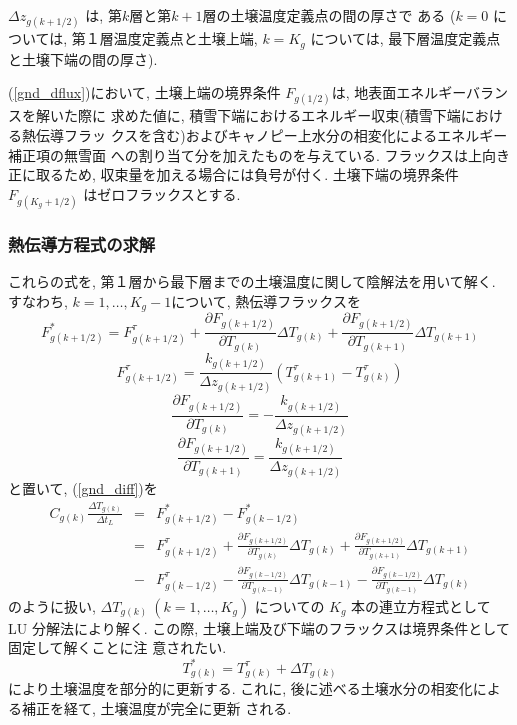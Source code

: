 $\Delta z_{g(k+1/2)}$ は, 第$k$層と第$k+1$層の土壌温度定義点の間の厚さで
ある ($k=0$ については, 第１層温度定義点と土壌上端, $k=K_g$ については,
最下層温度定義点と土壌下端の間の厚さ).

(\ref{gnd_dflux})において,
土壌上端の境界条件 $F_{g(1/2)}$は, 地表面エネルギーバランスを解いた際に
求めた値に, 積雪下端におけるエネルギー収束(積雪下端における熱伝導フラッ
クスを含む)およびキャノピー上水分の相変化によるエネルギー補正項の無雪面
への割り当て分を加えたものを与えている. フラックスは上向き正に取るため,
収束量を加える場合には負号が付く.
土壌下端の境界条件 $F_{g(K_g+1/2)}$ はゼロフラックスとする.

\subsubsection{熱伝導方程式の求解}

これらの式を, 第１層から最下層までの土壌温度に関して陰解法を用いて解く.
すなわち, $k=1,\ldots,K_g-1$について, 熱伝導フラックスを
\begin{equation}
  F_{g(k+1/2)}^{*} = F_{g(k+1/2)}^{\tau}
+\frac{\partial {F}_{g(k+1/2)}}{\partial T_{g(k)}}
 \Delta T_{g(k)}
+\frac{\partial {F}_{g(k+1/2)}}{\partial T_{g(k+1)}}
 \Delta T_{g(k+1)}
\end{equation}
\begin{equation}
  F_{g(k+1/2)}^{\tau} =
\frac{k_{g(k+1/2)}}{\Delta z_{g(k+1/2)}}(T_{g(k+1)}^{\tau} - T_{g(k)}^{\tau})
\end{equation}
\begin{equation}
 \frac{\partial {F}_{g(k+1/2)}}{\partial T_{g(k)}} =
- \frac{k_{g(k+1/2)}}{\Delta z_{g(k+1/2)}}
\end{equation}
\begin{equation}
 \frac{\partial {F}_{g(k+1/2)}}{\partial T_{g(k+1)}} =
\frac{k_{g(k+1/2)}}{\Delta z_{g(k+1/2)}}
\end{equation}
と置いて, (\ref{gnd_diff})を
\begin{eqnarray}
C_{g(k)} \frac{\Delta T_{g(k)}}{\Delta t_L}
&=& F_{g(k+1/2)}^* - {F}_{g(k-1/2)}^* \nonumber \\
&=& {F}_{g(k+1/2)}^{\tau}
+\frac{\partial F_{g(k+1/2)}}{\partial T_{g(k)}}
 \Delta T_{g(k)}
+\frac{\partial F_{g(k+1/2)}}{\partial T_{g(k+1)}}
 \Delta T_{g(k+1)} \nonumber \\
&-& F_{g(k-1/2)}^{\tau}
-\frac{\partial F_{g(k-1/2)}}{\partial T_{g(k-1)}}
 \Delta T_{g(k-1)}
-\frac{\partial F_{g(k-1/2)}}{\partial T_{g(k-1)}}
 \Delta T_{g(k)}
\end{eqnarray}
のように扱い, $\Delta T_{g(k)}\ (k=1,\ldots,K_{g})$ についての
$K_{g}$ 本の連立方程式として LU 分解法により解く.
この際, 土壌上端及び下端のフラックスは境界条件として固定して解くことに注
意されたい.
\begin{equation}
 T_{g(k)}^* = T_{g(k)}^{\tau} + \Delta T_{g(k)}
\end{equation}
により土壌温度を部分的に更新する.
これに, 後に述べる土壌水分の相変化による補正を経て, 土壌温度が完全に更新
される.

